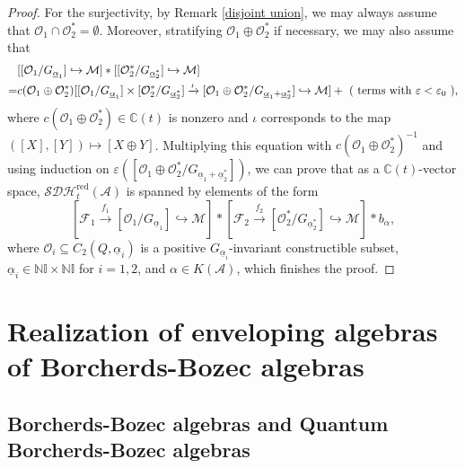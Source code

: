 \documentclass[12pt]{amsart}
\theoremstyle{definition}
\numberwithin{equation}{section}
\begin{document}
\begin{proof}
    For the surjectivity, by Remark \ref{disjoint union}, we may always assume that $ \mathcal{O}_1 \cap \mathcal{O}_2^* = \emptyset $. 
    Moreover, stratifying $ \mathcal{O}_1 \oplus \mathcal{O}_2^* $ if necessary, we may also assume that
    \begin{align*}
    &[[\mathcal{O}_1/G_{\underline{\alpha}_1}]\hookrightarrow \mathcal{M}] * [[\mathcal{O}_2^*/G_{\underline{\alpha}_2^*}] \hookrightarrow \mathcal{M}] \\
    =& c(\mathcal{O}_1 \oplus \mathcal{O}_2^*) [[\mathcal{O}_1/G_{\underline{\alpha}_1}] \times [\mathcal{O}_2^*/G_{\underline{\alpha}_2^*}]\xrightarrow{\iota} [\mathcal{O}_1 \oplus \mathcal{O}_2^*/G_{\underline{\alpha}_1+\underline{\alpha}_2^*}] \hookrightarrow \mathcal{M}] + \text{ ( terms with $ \varepsilon < \varepsilon_0 $ )},
    \end{align*}
    where  $ c(\mathcal{O}_1 \oplus \mathcal{O}_2^*) \in \mathbb{C}(t) $ is nonzero and $ \iota $ corresponds to the map $ ([X],[Y]) \mapsto [X \oplus Y] $. 
    Multiplying this equation with $ c(\mathcal{O}_1 \oplus \mathcal{O}_2^*)^{-1} $ and using induction on $ \varepsilon([\mathcal{O}_1 \oplus \mathcal{O}_2^*/G_{\underline{\alpha}_1+\underline{\alpha}_2^*}]) $, we can prove that as a $ \mathbb{C}(t) $-vector space,  $ \mathcal{SDH}^{\mathrm{red}}_t(\mathcal{A}) $ is spanned by elements of the form
\[[\mathcal{F}_1 \xrightarrow{f_1}[\mathcal{O}_1/G_{\underline{\alpha}_1}] \hookrightarrow \mathcal{M}]  * [\mathcal{F}_2 \xrightarrow{f_2}[\mathcal{O}_2^*/G_{\underline{\alpha}_2^*}] \hookrightarrow \mathcal{M}] *  b_{\alpha}, \]
    where $ \mathcal{O}_i \subseteq C_2(Q, \underline{\alpha}_i) $ is a positive $ G_{\underline{\alpha}_i} $-invariant constructible subset, $ \underline{\alpha}_i \in \mathbb{N}\mathbb{I} \times \mathbb{N}\mathbb{I} $ for  $ i=1,2 $, and $ \alpha \in K(\mathcal{A}) $, which finishes the proof. 

\end{proof}


\newpage


\section{Realization of enveloping algebras of Borcherds-Bozec algebras}
\label{Realization of enveloping algebras of Borcherds-Bozec algebras}

\subsection{Borcherds-Bozec algebras and Quantum Borcherds-Bozec algebras}\;
\label{Borcherds-Bozec algebras and Quantum Borcherds-Bozec algebras}
\end{document}
